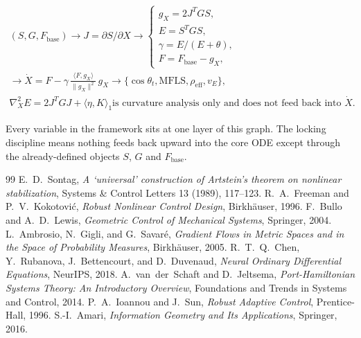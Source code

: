 \documentclass[11pt,oneside]{amsart}
\def\quad{ }%
\def\textbf#1{#1}%
\theoremstyle{plain}
\theoremstyle{definition}
\newcommand{\Xdot}{\dot{X}}
\newcommand{\gX}{g_X}
\newcommand{\Fbase}{F_{\mathrm{base}}}
\begin{document}
\[
\begin{gathered}
  (S,G,\Fbase) \longrightarrow J=\partial S/\partial X
  \longrightarrow
  \begin{cases}
    \gX=2J^TGS,\\
    E=S^TGS,\\
    \gamma=E/(E+\theta),\\
    F=\Fbase-\gX,
  \end{cases}\\[3pt]
  \longrightarrow\quad
  \Xdot = F-\gamma\,\frac{\langle F,\gX\rangle}{\|\gX\|^2}\,\gX
  \quad\longrightarrow\quad
  \{\cos\theta_t,\mathrm{MFLS},\rho_{\mathrm{eff}},v_E\},\\[3pt]
  \nabla_X^2E=2J^TGJ+\langle\eta,K\rangle_1
  \quad\text{is curvature analysis only and does not feed back into }\Xdot.
\end{gathered}
\]

\begin{lockbox}
Every variable in the framework sits at one layer of this graph.  The
locking discipline means nothing feeds back upward into the core ODE
except through the already-defined objects $S$, $G$ and $\Fbase$.
\end{lockbox}

\begin{thebibliography}{99}
  E.~D.~Sontag, \emph{A `universal' construction of Artstein's theorem on
  nonlinear stabilization}, Systems \& Control Letters \textbf{13}
  (1989), 117--123.
  R.~A.~Freeman and P.~V.~Kokotovi\'c, \emph{Robust Nonlinear Control
  Design}, Birkh\"auser, 1996.
  F.~Bullo and A.~D.~Lewis, \emph{Geometric Control of Mechanical
  Systems}, Springer, 2004.
  L.~Ambrosio, N.~Gigli, and G.~Savar\'e, \emph{Gradient Flows in
  Metric Spaces and in the Space of Probability Measures},
  Birkh\"auser, 2005.
  R.~T.~Q.~Chen, Y.~Rubanova, J.~Bettencourt, and D.~Duvenaud,
  \emph{Neural Ordinary Differential Equations}, NeurIPS, 2018.
  A.~van~der~Schaft and D.~Jeltsema, \emph{Port-Hamiltonian Systems
  Theory: An Introductory Overview}, Foundations and Trends in
  Systems and Control, 2014.
  P.~A.~Ioannou and J.~Sun, \emph{Robust Adaptive Control},
  Prentice-Hall, 1996.
  S.-I.~Amari, \emph{Information Geometry and Its Applications},
  Springer, 2016.
\end{thebibliography}
\end{document}
